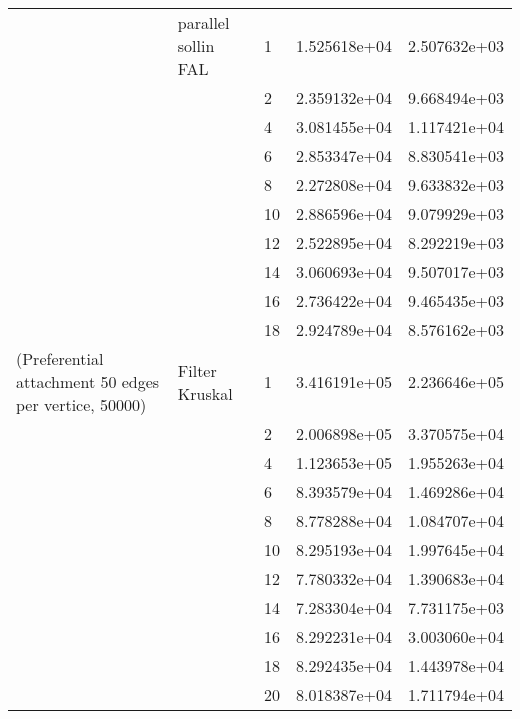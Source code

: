 \begin{tabular}{lllrr}
                      & parallel sollin FAL & 1  &  1.525618e+04 &  2.507632e+03 \\
                      &                     & 2  &  2.359132e+04 &  9.668494e+03 \\
                      &                     & 4  &  3.081455e+04 &  1.117421e+04 \\
                      &                     & 6  &  2.853347e+04 &  8.830541e+03 \\
                      &                     & 8  &  2.272808e+04 &  9.633832e+03 \\
                      &                     & 10 &  2.886596e+04 &  9.079929e+03 \\
                      &                     & 12 &  2.522895e+04 &  8.292219e+03 \\
                      &                     & 14 &  3.060693e+04 &  9.507017e+03 \\
                      &                     & 16 &  2.736422e+04 &  9.465435e+03 \\
                      &                     & 18 &  2.924789e+04 &  8.576162e+03 \\
(Preferential attachment 50 edges per vertice, 50000) & Filter Kruskal & 1  &  3.416191e+05 &  2.236646e+05 \\
                      &                     & 2  &  2.006898e+05 &  3.370575e+04 \\
                      &                     & 4  &  1.123653e+05 &  1.955263e+04 \\
                      &                     & 6  &  8.393579e+04 &  1.469286e+04 \\
                      &                     & 8  &  8.778288e+04 &  1.084707e+04 \\
                      &                     & 10 &  8.295193e+04 &  1.997645e+04 \\
                      &                     & 12 &  7.780332e+04 &  1.390683e+04 \\
                      &                     & 14 &  7.283304e+04 &  7.731175e+03 \\
                      &                     & 16 &  8.292231e+04 &  3.003060e+04 \\
                      &                     & 18 &  8.292435e+04 &  1.443978e+04 \\
                      &                     & 20 &  8.018387e+04 &  1.711794e+04 \\

\end{tabular}
